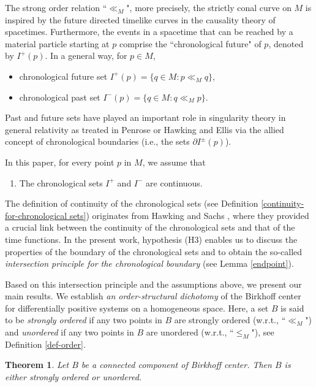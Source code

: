 \documentclass[a4paper,11pt]{article}
\theoremstyle{plain}
\newtheorem{thmm}{Theorem}[subsection]
\theoremstyle{definition}
\numberwithin{equation}{section}
\begin{document}
The strong order relation ``$\ll_M$", more precisely, the strictly conal curve on $M$ is inspired by the future directed timelike curves in the causality theory of spacetimes. Furthermore, the events in a spacetime that can be reached by a material particle starting at $p$ comprise the ``chronological future" of $p$, denoted by $I^+(p)$. In a general way, for $p\in M$,
\begin{itemize}
	\item chronological future set $I^+(p)=\{q\in M \colon p\ll_M q\}$,
	\item chronological past set $I^-(p)=\{q\in M \colon q\ll_M p\}$.
\end{itemize}
Past and future sets have played an important role in singularity theory in general relativity as treated in Penrose \cite{Penrose72} or Hawking and Ellis \cite{Hawkingandellis73} via the allied concept of chronological boundaries (i.e., the sets $\partial I^{\pm}(p)$).

In this paper, for every point $p$ in $M$, we assume that
\begin{enumerate}
	\item[{\bf (H3)}] The chronological sets $I^+$ and $I^-$ are continuous.
\end{enumerate}
The definition of continuity of the chronological sets (see Definition \ref{continuity-for-chronological sets}) originates from Hawking and Sachs \cite[Section 1.6]{Hawkingandsachs74}, where they provided a crucial link between the continuity of the chronological sets and that of the time functions.
In the present work, hypothesis (H3) enables us to discuss the properties of the boundary of the chronological sets and to obtain the so-called \textit{intersection principle for the chronological boundary} (see Lemma \ref{endpoint}).


Based on this intersection principle and the assumptions above, we present our main results. We establish \textit{an order-structural dichotomy} of the Birkhoff center for differentially positive systems on a homogeneous space. Here, a set $B$ is said to be \textit{strongly ordered} if any two points in $B$ are strongly ordered (w.r.t., ``$\ll_M$") and \textit{unordered} if any two points in $B$ are unordered (w.r.t., ``$\leq_M$"), see Definition \ref{def-order}.

\renewcommand{\thethmm}{\Alph{thmm}}

\begin{thmm}\label{Thm}
	Let $B$ be a connected component of Birkhoff center. Then $B$ is either strongly ordered or unordered.
\end{thmm}
\end{document}
